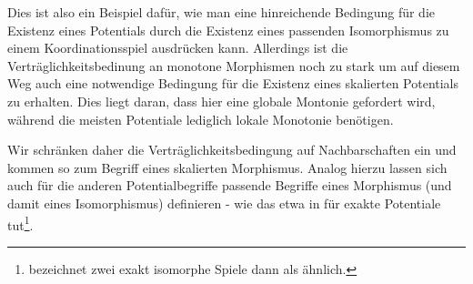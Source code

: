 Dies ist also ein Beispiel dafür, wie man eine hinreichende Bedingung für die Existenz eines Potentials durch die Existenz eines passenden Isomorphismus zu einem Koordinationsspiel ausdrücken kann. Allerdings ist die Verträglichkeitsbedinung an monotone Morphismen noch zu stark um auf diesem Weg auch eine notwendige Bedingung für die Existenz eines skalierten Potentials zu erhalten. Dies liegt daran, dass hier eine globale Montonie gefordert wird, während die meisten Potentiale lediglich lokale Monotonie benötigen.


Wir schränken daher die Verträglichkeitsbedingung auf Nachbarschaften ein und kommen so zum Begriff eines skalierten Morphismus. Analog hierzu lassen sich auch für die anderen Potentialbegriffe passende Begriffe eines Morphismus (und damit eines Isomorphismus) definieren - wie das etwa \citeauthor{ReprOfFiniteGamesAsNCG} in \cite[Abschnitt 2.1]{ReprOfFiniteGamesAsNCG} für exakte Potentiale tut\footnote{\citeauthor{ReprOfFiniteGamesAsNCG} bezeichnet zwei exakt isomorphe Spiele dann als \glqq ähnlich\grqq.}.

